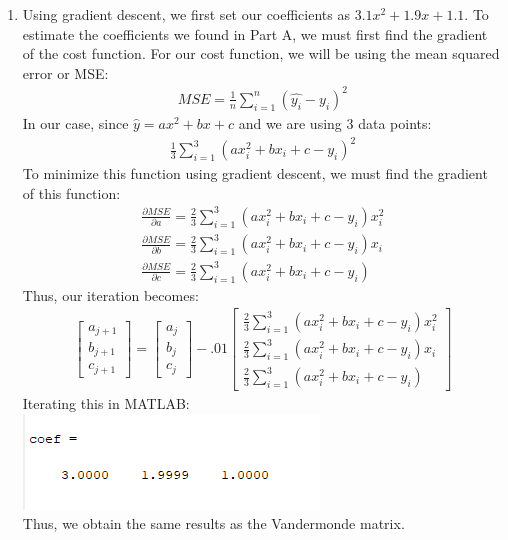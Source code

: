 \documentclass{article}
\begin{document}
\begin{enumerate}
\begin{enumerate}
        \item Using gradient descent, we first set our coefficients as $3.1x^2+1.9x+1.1$. 
        To estimate the coefficients we found in Part A, we must first find the gradient 
        of the cost function. For our cost function, we will be using the mean squared
        error or MSE:
        \begin{gather*}
            MSE = \frac{1}{n}\sum_{i = 1}^n{(\hat{y_i} - y_i)^2}
        \end{gather*}
        In our case, since $\hat{y} = ax^2 + bx + c$ and we are using 3 data points:
        \begin{gather*}
            \frac{1}{3}\sum_{i = 1}^3{(ax_i^2 + bx_i + c - y_i)^2}
        \end{gather*}
        To minimize this function using gradient descent, we must find the gradient of 
        this function: 
        \begin{gather*}
            \frac{\partial MSE}{\partial a} = \frac{2}{3}\sum_{i = 1}^3{(ax_i^2 + bx_i + c - y_i)x_i^2}\\
            \frac{\partial MSE}{\partial b} = \frac{2}{3}\sum_{i = 1}^3{(ax_i^2 + bx_i + c - y_i)x_i}\\
            \frac{\partial MSE}{\partial c} = \frac{2}{3}\sum_{i = 1}^3{(ax_i^2 + bx_i + c - y_i)}
        \end{gather*} 
        Thus, our iteration becomes: 
        \begin{gather*}
            \begin{bmatrix}
                a_{j+1}\\
                b_{j+1}\\
                c_{j+1}
            \end{bmatrix} 
            =
            \begin{bmatrix}
                a_{j}\\
                b_{j}\\
                c_{j}
            \end{bmatrix}
            - .01
            \begin{bmatrix}
                \frac{2}{3}\sum_{i = 1}^3{(ax_i^2 + bx_i + c - y_i)x_i^2}\\
                \frac{2}{3}\sum_{i = 1}^3{(ax_i^2 + bx_i + c - y_i)x_i}\\
                \frac{2}{3}\sum_{i = 1}^3{(ax_i^2 + bx_i + c - y_i)}
            \end{bmatrix}
        \end{gather*}
        Iterating this in MATLAB: \\
        \includegraphics{3b.png}\\
        Thus, we obtain the same results as the Vandermonde matrix. 
    \end{enumerate}
\end{enumerate}
\end{document}
